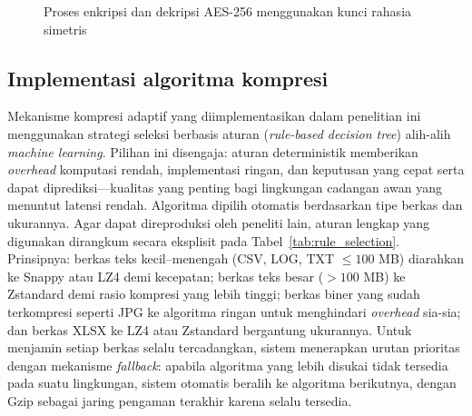 \documentclass{iaesarticle}
\begin{document}
\begin{figure}[H]
\centering
{}
\vspace{.7em}
\caption{Proses enkripsi dan dekripsi AES-256 menggunakan kunci rahasia simetris}
\label{fig:aes}
\end{figure}

\subsection{Implementasi algoritma kompresi}
Mekanisme kompresi adaptif yang diimplementasikan dalam penelitian ini menggunakan strategi seleksi berbasis aturan (\textit{rule-based decision tree}) alih-alih \textit{machine learning}. Pilihan ini disengaja: aturan deterministik memberikan \textit{overhead} komputasi rendah, implementasi ringan, dan keputusan yang cepat serta dapat diprediksi---kualitas yang penting bagi lingkungan cadangan awan yang menuntut latensi rendah. Algoritma dipilih otomatis berdasarkan tipe berkas dan ukurannya. Agar dapat direproduksi oleh peneliti lain, aturan lengkap yang digunakan dirangkum secara eksplisit pada Tabel~\ref{tab:rule_selection}. Prinsipnya: berkas teks kecil--menengah (CSV, LOG, TXT $\leq 100$ MB) diarahkan ke Snappy atau LZ4 demi kecepatan; berkas teks besar ($> 100$ MB) ke Zstandard demi rasio kompresi yang lebih tinggi; berkas biner yang sudah terkompresi seperti JPG ke algoritma ringan untuk menghindari \textit{overhead} sia-sia; dan berkas XLSX ke LZ4 atau Zstandard bergantung ukurannya. Untuk menjamin setiap berkas selalu tercadangkan, sistem menerapkan urutan prioritas dengan mekanisme \textit{fallback}: apabila algoritma yang lebih disukai tidak tersedia pada suatu lingkungan, sistem otomatis beralih ke algoritma berikutnya, dengan Gzip sebagai jaring pengaman terakhir karena selalu tersedia.
\end{document}
